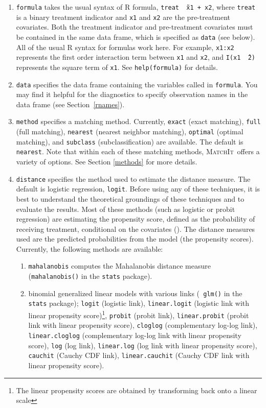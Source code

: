 \documentclass[oneside,letterpaper,titlepage]{article}
\newcommand{\MatchIt}{\textsc{MatchIt}}
\begin{document}
\begin{enumerate}
  
\item \texttt{formula} takes the usual syntax of R formula, {\tt treat
    \~\ x1 + x2}, where {\tt treat} is a binary treatment indicator
  and {\tt x1} and {\tt x2} are the pre-treatment covariates. Both the
  treatment indicator and pre-treatment covariates must be contained
  in the same data frame, which is specified as {\tt data} (see
  below).  All of the usual R syntax for formulas work here. For
  example, {\tt x1:x2} represents the first order interaction term
  between {\tt x1} and {\tt x2}, and {\tt I(x1 \^\ 2)} represents the
  square term of {\tt x1}. See {\tt help(formula)} for details.
  
\item \texttt{data} specifies the data frame containing the variables
  called in {\tt formula}.  You may find it helpful for the
  diagnostics to specify observation names in the data frame (see
  Section~\ref{rnames}).
  
\item \texttt{method} specifies a matching method. Currently,
  \texttt{exact} (exact matching), \texttt{full} (full matching),
  \texttt{nearest} (nearest neighbor matching), \texttt{optimal}
  (optimal matching), and \texttt{subclass} (subclassification) are
  available. The default is \texttt{nearest}. Note that within each of
  these matching methods, \MatchIt\ offers a variety of options.  See
  Section \ref{methods} for more details.
  
\item \texttt{distance} specifies the method used to estimate the
  distance measure. The default is logistic regression, {\tt logit}.
  Before using any of these techniques, it is best to understand the
  theoretical groundings of these techniques and to evaluate the
  results.  Most of these methods (such as logistic or probit
  regression) are estimating the propensity score, defined as the
  probability of receiving treatment, conditional on the covariates
  (\cite{RosRub83}).  The distance measures used are the predicted
  probabilities from the model (the propensity scores).  Currently,
  the following methods are available:
  \begin{enumerate}
  \item {\tt mahalanobis} computes the Mahalanobis distance measure
    ({\tt mahalanobis()} in the {\tt stats} package).
  \item binomial generalized linear models with various links ({\tt
      glm()} in the {\tt stats} package); \texttt{logit} (logistic
    link), {\tt linear.logit} (logistic link with linear propensity
    score)\footnote{The linear propensity scores are obtained by
      transforming back onto a linear scale}, \texttt{probit} (probit
    link), {\tt linear.probit} (probit link with linear propensity
    score), {\tt cloglog} (complementary log-log link), {\tt
      linear.cloglog} (complementary log-log link with linear
    propensity score), {\tt log} (log link), {\tt linear.log} (log
    link with linear propensity score), {\tt cauchit} (Cauchy CDF
    link), {\tt linear.cauchit} (Cauchy CDF link with linear
    propensity score).


\end{enumerate}
\end{enumerate}
\end{document}
